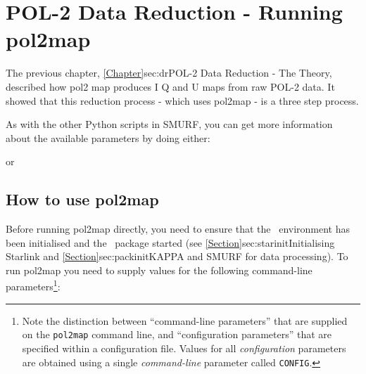 \chapter{POL-2 Data Reduction - Running pol2map}
\label{sec:rundr}

The previous chapter, \cref{Chapter}{sec:dr}{POL-2 Data Reduction - The Theory}, described how pol2 map produces I Q and U maps from raw POL-2 data.
It showed that this reduction process - which uses pol2map - is a three step process.

As with the other Python scripts in SMURF, you can get more information about the available
parameters by doing either:
\begin{terminalv}
\end{terminalv}
or
\begin{terminalv}
\end{terminalv}

\section{How to use pol2map}

Before running pol2map directly, you need to ensure that the \starlink\ environment has been
initialised and the \smurf\ package started (see
\cref{Section}{sec:starinit}{Initialising Starlink} and
\cref{Section}{sec:packinit}{KAPPA and SMURF for data processing}).
To run pol2map you need to supply values for the
following command-line parameters\footnote{Note the distinction between
``command-line parameters'' that are
supplied on the \texttt{pol2map} command line, and ``configuration parameters''
that are specified within a configuration file. Values for all
\emph{configuration} parameters are obtained using a single \emph{command-line}
parameter called \texttt{CONFIG}.}:



